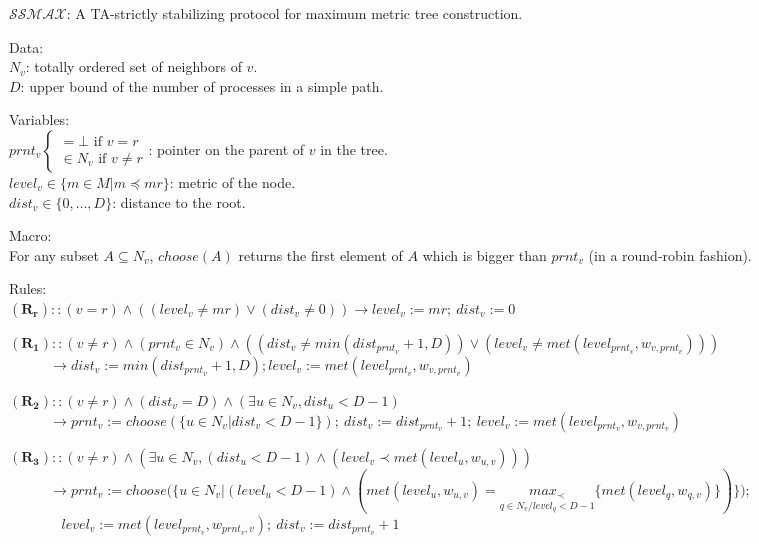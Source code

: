 \documentclass[11pt]{article}
\begin{document}
\begin{algorithm}
\caption{$\mathcal{SSMAX}$: A TA-strictly stabilizing protocol for maximum metric tree construction.}\label{algo:max}
\scriptsize
\begin{description}
\item{Data:}~\\
$N_v$: totally ordered set of neighbors of $v$.\\
$D$: upper bound of the number of processes in a simple path.
\item{Variables:}~\\
$prnt_v\begin{cases}=\bot \text{ if } v=r\\\in N_v \text{ if } v\neq r\end{cases}$: pointer on the parent of $v$ in the tree.\\
$level_v\in\{m\in M|m\preceq mr\}$: metric of the node.\\
$dist_v\in\{0,\ldots,D\}$: distance to the root.
\item{Macro:}~\\
For any subset $A\subseteq N_v$, $choose(A)$ returns the first element of $A$ which is bigger than $prnt_v$ (in a round-robin fashion).
\item{Rules:}~\\
$\boldsymbol{(R_r)}::(v=r)\wedge((level_v\neq mr)\vee(dist_v\neq 0))\longrightarrow level_v:=mr;~dist_v:=0$

$\boldsymbol{(R_1)}::(v\neq r)\wedge(prnt_v\in N_v)\wedge((dist_v\neq min(dist_{prnt_v}+1,D))\vee(level_v\neq met(level_{prnt_v},w_{v,prnt_v})))$\\ $~~~~~~~~~~~~~\longrightarrow dist_v:=min(dist_{prnt_v}+1,D);level_v:=met(level_{prnt_v},w_{v,prnt_v})$

$\boldsymbol{(R_2)}::(v\neq r)\wedge(dist_v=D)\wedge(\exists u \in N_v, dist_u<D-1)$\\$~~~~~~~~~~~~~\longrightarrow prnt_v:=choose(\{u\in N_v|dist_v<D-1\});~dist_v:=dist_{prnt_v}+1;~level_v:=met(level_{prnt_v},w_{v,prnt_v})$

$\boldsymbol{(R_3)}::(v\neq r)\wedge(\exists u\in N_v,(dist_u<D-1)\wedge(level_v\prec met(level_u,w_{u,v})))$\\
$~~~~~~~~~~~~~\longrightarrow prnt_v:=choose\Bigg(\Bigg\{u\in N_v\Big|(level_u<D-1)\wedge(met(level_u,w_{u,v})=\underset{q\in N_v/level_q<D-1}{max_\prec}\{met(level_q,w_{q,v})\})\Bigg\}\Bigg);$\\
$~~~~~~~~~~~~~~~~~level_v:=met(level_{prnt_v},w_{prnt_v,v});~dist_v:=dist_{prnt_v}+1$
\end{description}
\end{algorithm}
\normalsize
\end{document}
